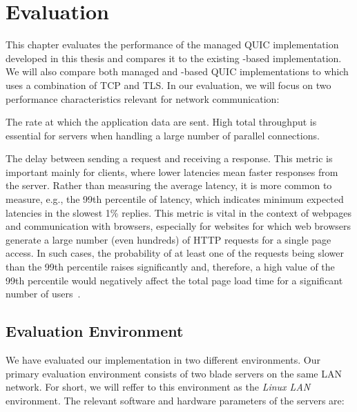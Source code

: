 \chapter{Evaluation}\label{chap:04-evaluation}

This chapter evaluates the performance of the managed QUIC implementation developed in this thesis
and compares it to the existing \libmsquic{}-based implementation. We will also compare both managed
and \libmsquic{}-based QUIC implementations to  which uses a combination of TCP and
TLS\@. In our evaluation, we will focus on two performance characteristics relevant for network
communication:

\begin{itemize}

         The rate at which the application data are sent. High total throughput is
essential for servers when handling a large number of parallel connections.

         The delay between sending a request and receiving a
response. This metric is important mainly for clients, where lower latencies mean faster responses
from the server. Rather than measuring the average latency, it is more common to measure, e.g., the
99th percentile of latency, which indicates minimum expected latencies in the slowest 1\% replies.
This metric is vital in the context of webpages and communication with browsers, especially for
websites for which web browsers generate a large number (even hundreds) of HTTP requests for a
single page access. In such cases, the probability of at least one of the requests being slower than
the 99th percentile raises significantly and, therefore, a high value of the 99th percentile would
negatively affect the total page load time for a significant number of users~\cite{Treat2015}.

\end{itemize}

\section{Evaluation Environment}

We have evaluated our implementation in two different environments. Our primary evaluation
environment consists of two blade servers on the same LAN network. For short, we will reffer to this
environment as the \textit{Linux LAN} environment. The relevant software and hardware parameters of
the servers are:

